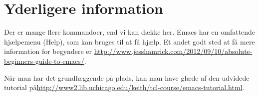 \documentclass[a4paper]{article}
\begin{document}
\section{Yderligere information}

Der er mange flere kommandoer, end vi kan dække her.  Emacs har en
omfattende hjælpemenu (\textsf{Help}), som kan bruges til at få hjælp.
Et andet godt sted at få mere information for begyndere er
\url{http://www.jesshamrick.com/2012/09/10/absolute-beginners-guide-to-emacs/}.

Når man har det grundlæggende på plads, kan man have glæde af den udvidede tutorial på\newline \url{http://www2.lib.uchicago.edu/keith/tcl-course/emacs-tutorial.html}.
\end{document}
